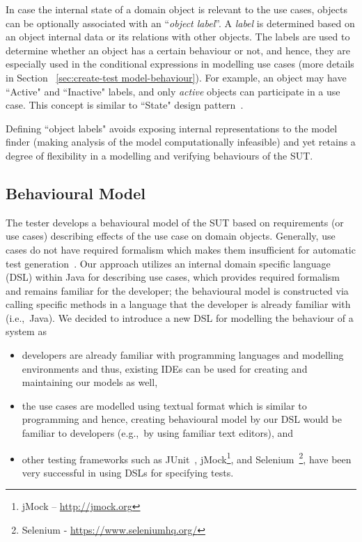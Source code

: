 In case the internal state of a domain object is relevant to the use cases, objects can be optionally associated with an ``\textit{object label}''.
A \textit{label} is determined based on an object internal data or its relations with other objects. The labels are used to determine whether an object has a certain behaviour or not, and hence, they are especially used in the conditional expressions in modelling use cases (more details in Section ~\ref{sec:create-test model-behaviour}). For example, an object may have ``Active" and ``Inactive" labels, and only \textit{active} objects can participate in a use case. This concept is similar to ``State" design pattern~\cite{Gamma1995}. 

Defining ``object labels" avoids exposing internal representations to the model finder (making analysis of the model computationally infeasible) and yet retains a degree of flexibility in a modelling and verifying behaviours of the SUT.


\subsection{Behavioural Model}
\label{sec:framework-overview-behaviour}
The tester develops a behavioural model of the SUT based on requirements (or use cases) describing effects of the use case on domain objects. Generally, use cases do not have required formalism which makes them insufficient for automatic test generation~\cite{}. Our approach utilizes an internal domain specific language (DSL) within Java for describing use cases, which provides required formalism and remains familiar for the developer;  the behavioural model is constructed via calling specific methods in a language that the developer is already familiar with (i.e.,\ Java).
We decided to introduce a new DSL for modelling the behaviour of a system as 
\begin{itemize}
	\item developers are already familiar with programming languages and modelling environments and thus, existing IDEs can be used for creating and maintaining our models as well,
	
	\item the use cases are modelled using textual format which is similar to programming and hence, creating behavioural model by our DSL would be familiar to developers (e.g.,\ by using familiar text editors), and 
	
	\item other testing frameworks such as JUnit~\cite{Beck2000}, jMock\footnote{ jMock – \url{http://jmock.org}}, and Selenium~\footnote{Selenium - \url{https://www.seleniumhq.org/}}, have been very successful in using DSLs for specifying tests.
\end{itemize}

